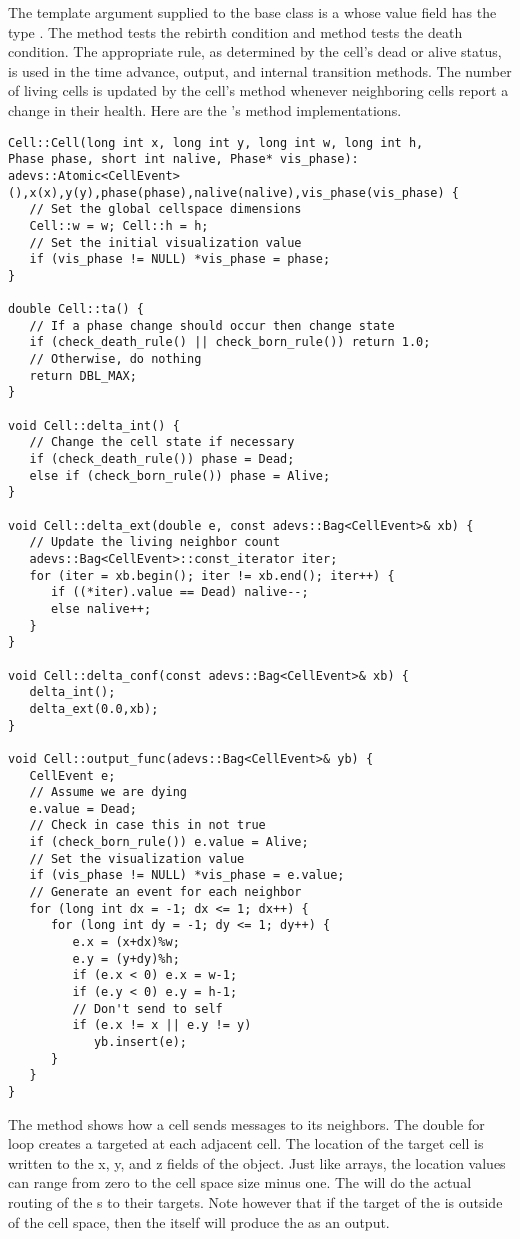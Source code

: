 The template argument supplied to the base  class is a  whose value field has the type . The  method tests the rebirth condition and  method tests the death condition. The appropriate rule, as determined by the cell's dead or alive status, is used in the time advance, output, and internal transition methods. The number of living cells is updated by the cell's  method whenever neighboring cells report a change in their health. Here are the 's method implementations.
\begin{verbatim}
Cell::Cell(long int x, long int y, long int w, long int h, 
Phase phase, short int nalive, Phase* vis_phase):
adevs::Atomic<CellEvent>(),x(x),y(y),phase(phase),nalive(nalive),vis_phase(vis_phase) {
   // Set the global cellspace dimensions
   Cell::w = w; Cell::h = h;
   // Set the initial visualization value
   if (vis_phase != NULL) *vis_phase = phase;
}

double Cell::ta() {
   // If a phase change should occur then change state 
   if (check_death_rule() || check_born_rule()) return 1.0;
   // Otherwise, do nothing
   return DBL_MAX;
}

void Cell::delta_int() { 
   // Change the cell state if necessary
   if (check_death_rule()) phase = Dead;
   else if (check_born_rule()) phase = Alive;
}

void Cell::delta_ext(double e, const adevs::Bag<CellEvent>& xb) {
   // Update the living neighbor count 
   adevs::Bag<CellEvent>::const_iterator iter;
   for (iter = xb.begin(); iter != xb.end(); iter++) {
      if ((*iter).value == Dead) nalive--;
      else nalive++;
   }
}

void Cell::delta_conf(const adevs::Bag<CellEvent>& xb) { 
   delta_int();
   delta_ext(0.0,xb);
}

void Cell::output_func(adevs::Bag<CellEvent>& yb) { 
   CellEvent e;
   // Assume we are dying
   e.value = Dead;
   // Check in case this in not true
   if (check_born_rule()) e.value = Alive;
   // Set the visualization value
   if (vis_phase != NULL) *vis_phase = e.value;
   // Generate an event for each neighbor
   for (long int dx = -1; dx <= 1; dx++) {
      for (long int dy = -1; dy <= 1; dy++) {
         e.x = (x+dx)%w;
         e.y = (y+dy)%h;
         if (e.x < 0) e.x = w-1;
         if (e.y < 0) e.y = h-1;
         // Don't send to self
         if (e.x != x || e.y != y)
            yb.insert(e);
      }
   }
}
\end{verbatim}
The  method shows how a cell sends messages to its neighbors. The double for loop creates a  targeted at each adjacent cell. The location of the target cell is written to the x, y, and z fields of the  object. Just like arrays, the location values can range from zero to the cell space size minus one. The  will do the actual routing of the s to their targets. Note however that if the target of the  is outside of the cell space, then the  itself will produce the  as an output.

